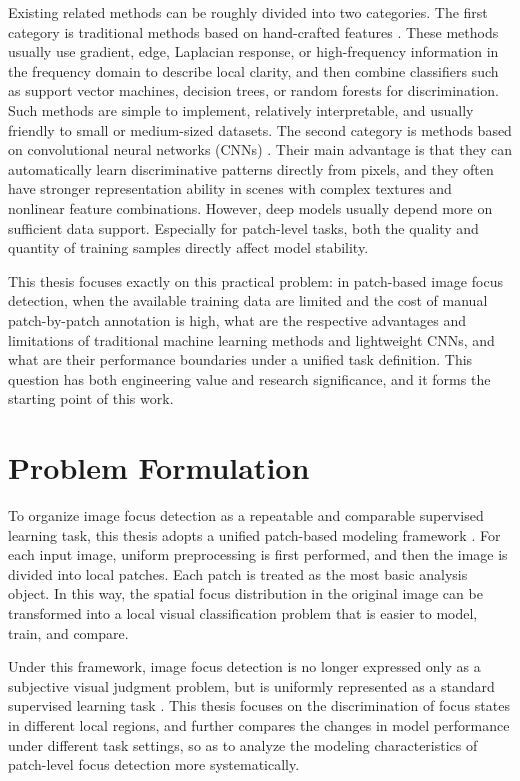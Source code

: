 \par Existing related methods can be roughly divided into two categories. The
first category is traditional methods based on hand-crafted features
\cite{murphy2022pml}. These methods usually use gradient, edge, Laplacian
response, or high-frequency information in the frequency domain to describe
local clarity, and then combine classifiers such as support vector machines,
decision trees, or random forests for discrimination. Such methods are simple
to implement, relatively interpretable, and usually friendly to small or
medium-sized datasets. The second category is methods based on convolutional
neural networks (CNNs) \cite{lecun2002gradient,krizhevsky2012imagenet}. Their
main advantage is that they can automatically learn discriminative patterns
directly from pixels, and they often have stronger representation ability in
scenes with complex textures and nonlinear feature combinations. However, deep
models usually depend more on sufficient data support. Especially for
patch-level tasks, both the quality and quantity of training samples directly
affect model stability.

\par This thesis focuses exactly on this practical problem: in patch-based image
focus detection, when the available training data are limited and the cost of
manual patch-by-patch annotation is high, what are the respective advantages
and limitations of traditional machine learning methods and lightweight CNNs,
and what are their performance boundaries under a unified task definition. This
question has both engineering value and research significance, and it forms the
starting point of this work.

\section{Problem Formulation}

\par To organize image focus detection as a repeatable and comparable supervised
learning task, this thesis adopts a unified patch-based modeling framework
\cite{Hou_2016_CVPR}. For each input image, uniform preprocessing is first
performed, and then the image is divided into local patches. Each patch is
treated as the most basic analysis object. In this way, the spatial focus
distribution in the original image can be transformed into a local visual
classification problem that is easier to model, train, and compare.

\par Under this framework, image focus detection is no longer expressed only as
a subjective visual judgment problem, but is uniformly represented as a
standard supervised learning task \cite{murphy2022pml}. This thesis focuses on
the discrimination of focus states in different local regions, and further
compares the changes in model performance under different task settings, so as
to analyze the modeling characteristics of patch-level focus detection more
systematically.

